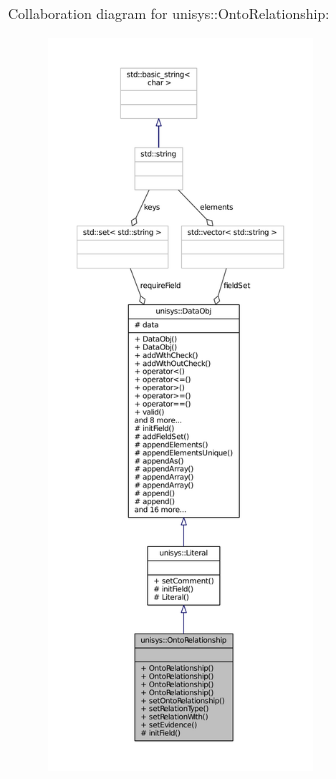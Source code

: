 Collaboration diagram for unisys\-:\-:Onto\-Relationship\-:
\nopagebreak
\begin{figure}[H]
\begin{center}
\leavevmode
\includegraphics[height=550pt]{classunisys_1_1OntoRelationship__coll__graph}
\end{center}
\end{figure}
